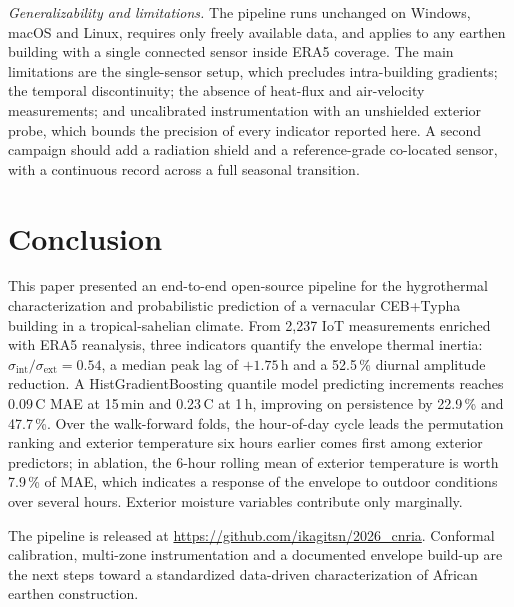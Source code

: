 \documentclass[conference]{IEEEtran}
\newcommand{\repourl}{\url{https://github.com/ikagitsn/2026_cnria}}
\newcommand{\ceb}{CEB+Typha\xspace}
\newcommand{\sigrat}{$\sigma_\text{int}/\sigma_\text{ext}$\xspace}
\begin{document}
\textit{Generalizability and limitations.}
The pipeline runs unchanged on Windows, macOS and Linux, requires only
freely available data, and applies to any earthen building with a
single connected sensor inside ERA5 coverage. The main limitations are
the single-sensor setup, which precludes intra-building gradients; the
temporal discontinuity; the absence of heat-flux and air-velocity
measurements; and uncalibrated instrumentation with an unshielded
exterior probe, which bounds the precision of every indicator reported
here. A second campaign should add a radiation shield and a
reference-grade co-located sensor, with a continuous record across a
full seasonal transition.

\section{Conclusion}
\label{sec:conclusion}

This paper presented an end-to-end open-source pipeline for the
hygrothermal characterization and probabilistic prediction of a
vernacular \ceb building in a tropical-sahelian climate. From 2,237 IoT
measurements enriched with ERA5 reanalysis, three indicators quantify
the envelope thermal inertia: \sigrat $=0.54$, a median peak lag of
$+1.75$\,h and a 52.5\,\% diurnal amplitude reduction. A
HistGradientBoosting quantile model predicting increments reaches
0.09\,\textdegree{}C MAE at 15\,min and 0.23\,\textdegree{}C at 1\,h,
improving on persistence by 22.9\,\% and 47.7\,\%. Over the walk-forward
folds, the hour-of-day cycle leads the permutation ranking and exterior
temperature six hours earlier comes first among exterior predictors; in
ablation, the 6-hour rolling mean of exterior temperature is worth
7.9\,\% of MAE, which indicates a response of the envelope to outdoor
conditions over several hours. Exterior moisture variables contribute
only marginally.

The pipeline is released at \repourl. Conformal calibration, multi-zone
instrumentation and a documented envelope build-up are the next steps
toward a standardized data-driven characterization of African earthen
construction.




\end{document}
